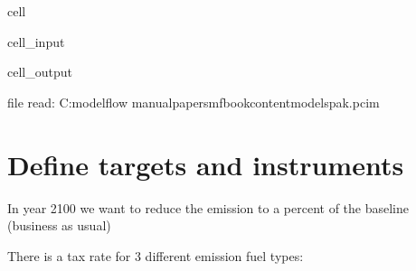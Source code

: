 \documentclass[letterpaper,10pt,english]{jupyterBook}
\begin{document}
\begin{sphinxuseclass}{cell}\begin{sphinxVerbatimInput}

\begin{sphinxuseclass}{cell_input}
\begin{sphinxVerbatim}[commandchars=\\\{\}]
  
\end{sphinxVerbatim}

\end{sphinxuseclass}\end{sphinxVerbatimInput}
\begin{sphinxVerbatimOutput}

\begin{sphinxuseclass}{cell_output}
\begin{sphinxVerbatim}[commandchars=\\\{\}]
file read:  C:\PYGZbs{}modelflow manual\PYGZbs{}papers\PYGZbs{}mfbook\PYGZbs{}content\PYGZbs{}models\PYGZbs{}pak.pcim
\end{sphinxVerbatim}

\end{sphinxuseclass}\end{sphinxVerbatimOutput}

\end{sphinxuseclass}

\section{Define targets and instruments}
\label{\detokenize{content/howto/targetinstruments/One target one instrument with 3 instrument variables:define-targets-and-instruments}}
\sphinxAtStartPar
In year 2100 we want to reduce the emission  to a percent of the baseline (business as usual)

\sphinxAtStartPar
There is a tax rate for 3 different emission fuel types:
\end{document}
